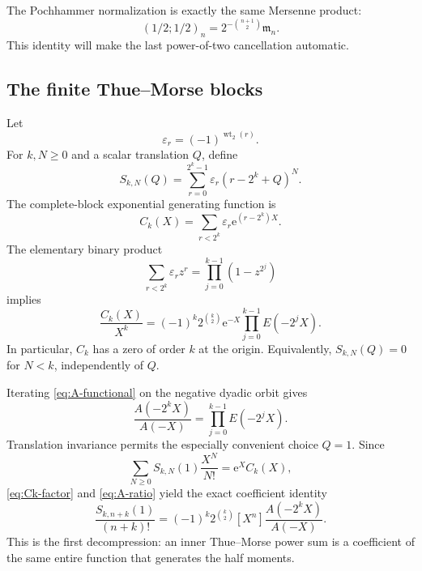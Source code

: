 \documentclass[11pt,oneside]{article}
\theoremstyle{definition}
\theoremstyle{remark}
\newcommand{\wt}{\operatorname{wt}_2}
\newcommand{\e}{\mathrm e}
\newcommand{\M}{\mathfrak m}
\newcommand{\epsTM}{\varepsilon}
\begin{document}
The Pochhammer normalization is exactly the same Mersenne product:
\begin{equation}
 (1/2;1/2)_n=2^{-\binom{n+1}{2}}\M_n.                      \label{eq:q-mersenne}
\end{equation}
This identity will make the last power-of-two cancellation automatic.

\subsection{The finite Thue--Morse blocks}

Let
\begin{equation}
 \epsTM_r=(-1)^{\wt(r)}.                                    \label{eq:tm-sign}
\end{equation}
For $k,N\ge0$ and a scalar translation $Q$, define
\begin{equation}
 S_{k,N}(Q)=\sum_{r=0}^{2^k-1}\epsTM_r(r-2^k+Q)^N.          \label{eq:Skn}
\end{equation}
The complete-block exponential generating function is
\begin{equation}
 C_k(X)=\sum_{r<2^k}\epsTM_r\e^{(r-2^k)X}.                 \label{eq:Ck}
\end{equation}
The elementary binary product
\begin{equation}
 \sum_{r<2^k}\epsTM_rz^r=\prod_{j=0}^{k-1}(1-z^{2^j})     \label{eq:tm-product}
\end{equation}
implies
\begin{equation}
 \frac{C_k(X)}{X^k}
 =(-1)^k2^{\binom k2}\e^{-X}
   \prod_{j=0}^{k-1}E(-2^jX).                              \label{eq:Ck-factor}
\end{equation}
In particular, $C_k$ has a zero of order $k$ at the origin.  Equivalently,
$S_{k,N}(Q)=0$ for $N<k$, independently of $Q$.

Iterating \eqref{eq:A-functional} on the negative dyadic orbit gives
\begin{equation}
 \frac{A(-2^kX)}{A(-X)}=\prod_{j=0}^{k-1}E(-2^jX).          \label{eq:A-ratio}
\end{equation}
Translation invariance permits the especially convenient choice $Q=1$.  Since
\begin{equation}
 \sum_{N\ge0}S_{k,N}(1)\frac{X^N}{N!}=\e^XC_k(X),          \label{eq:S-egf}
\end{equation}
\eqref{eq:Ck-factor} and \eqref{eq:A-ratio} yield the exact coefficient identity
\begin{equation}
 \boxed{
 \frac{S_{k,n+k}(1)}{(n+k)!}
 =(-1)^k2^{\binom k2}
 [X^n]\frac{A(-2^kX)}{A(-X)}.}                             \label{eq:S-ratio-coeff}
\end{equation}
This is the first decompression: an inner Thue--Morse power sum is a coefficient of the same
entire function that generates the half moments.
\end{document}
